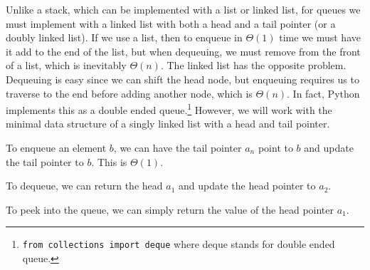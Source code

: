   Unlike a stack, which can be implemented with a list or linked list, for queues we must implement with a linked list with both a head and a tail pointer (or a doubly linked list). If we use a list, then to enqueue in $\Theta(1)$ time we must have it add to the end of the list, but when dequeuing, we must remove from the front of a list, which is inevitably $\Theta(n)$. The linked list has the opposite problem. Dequeuing is easy since we can shift the head node, but enqueuing requires us to traverse to the end before adding another node, which is $\Theta(n)$. In fact, Python implements this as a double ended queue.\footnote{\texttt{from collections import deque} where deque stands for double ended queue.} However, we will work with the minimal data structure of a singly linked list with a head and tail pointer. 

  \begin{algo}
    To enqueue an element $b$, we can have the tail pointer $a_n$ point to $b$ and update the tail pointer to $b$. This is $\Theta(1)$. 
  \end{algo}

  \begin{algo}
    To dequeue, we can return the head $a_1$ and update the head pointer to $a_2$.  
  \end{algo}

  \begin{algo}
    To peek into the queue, we can simply return the value of the head pointer $a_1$. 
  \end{algo}

